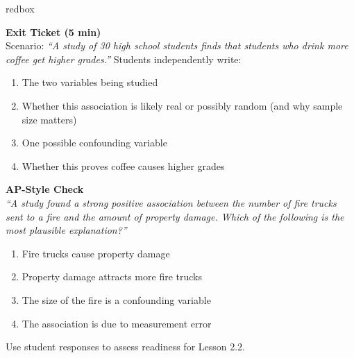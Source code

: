\documentclass[10pt]{article}
\begin{document}
\begin{skillbox}{redbox}
\begin{minipage}[t]{0.48\linewidth}
    \textbf{Exit Ticket (5 min)}\\
    Scenario: \textit{``A study of 30 high school students finds that students who drink
    more coffee get higher grades.''} Students independently write:
    \begin{enumerate}
        \item The two variables being studied
        \item Whether this association is likely real or possibly random (and why sample size matters)
        \item One possible confounding variable
        \item Whether this proves coffee causes higher grades
    \end{enumerate}
\end{minipage}
\hfill
\begin{minipage}[t]{0.48\linewidth}
    \textbf{AP-Style Check}\\
    \textit{``A study found a strong positive association between the number of fire trucks
    sent to a fire and the amount of property damage. Which of the following is the most
    plausible explanation?''}
    \begin{enumerate}[label=(\Alph*)]
        \item Fire trucks cause property damage
        \item Property damage attracts more fire trucks
        \item The size of the fire is a confounding variable
        \item The association is due to measurement error
    \end{enumerate}
    Use student responses to assess readiness for Lesson 2.2.
\end{minipage}
\end{skillbox}
\end{document}
